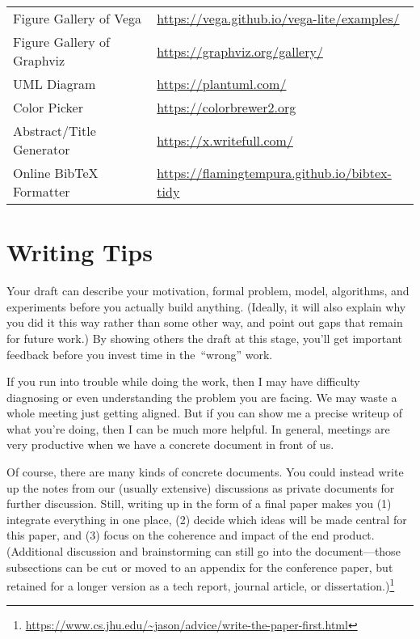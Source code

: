 \begin{table}
\begin{tabular}{ll}
		Figure Gallery of Vega            & \url{https://vega.github.io/vega-lite/examples/}   \\
		Figure Gallery of Graphviz        & \url{https://graphviz.org/gallery/}                \\
		UML Diagram                       & \url{https://plantuml.com/}                        \\
		Color Picker                      & \url{https://colorbrewer2.org}                     \\
		Abstract/Title Generator          & \url{https://x.writefull.com/}                     \\
		Online BibTeX Formatter           & \url{https://flamingtempura.github.io/bibtex-tidy} \\
		\bottomrule
	\end{tabular}
\end{table}

\section{Writing Tips}

Your draft can describe your motivation, formal problem, model, algorithms, and experiments before you actually build anything.
(Ideally, it will also explain why you did it this way rather than some other way, and point out gaps that remain for future work.)
By showing others the draft at this stage, you'll get important feedback before you invest time in the~\enquote{wrong} work.

If you run into trouble while doing the work, then I may have difficulty diagnosing or even understanding the problem you are facing.
We may waste a whole meeting just getting aligned.
But if you can show me a precise writeup of what you're doing, then I can be much more helpful.
In general, meetings are very productive when we have a concrete document in front of us.


Of course, there are many kinds of concrete documents.
You could instead write up the notes from our (usually extensive) discussions as private documents for further discussion.
Still, writing up in the form of a final paper makes you (1) integrate everything in one place, (2) decide which ideas will be made central for this paper, and (3) focus on the coherence and impact of the end product.
(Additional discussion and brainstorming can still go into the document—those subsections can be cut or moved to an appendix for the conference paper, but retained for a longer version as a tech report, journal article, or dissertation.)\footnote{\url{https://www.cs.jhu.edu/~jason/advice/write-the-paper-first.html}}

